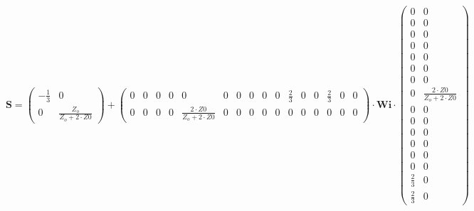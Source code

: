 \[ \mathbf{S} = \left(\begin{smallmatrix} -\frac{1}{3} & 0 \\ 0 &
\frac{Z_o}{Z_o+2\cdot Z0} \end{smallmatrix}\right) +
\left(\begin{smallmatrix} 0 & 0 & 0 & 0 & 0 & 0 & 0 & 0 & 0 & 0 &
\frac{2}{3} & 0 & 0 & \frac{2}{3} & 0 & 0 \\ 0 & 0 & 0 & 0 &
\frac{2\cdot Z0}{Z_o+2\cdot Z0} & 0 & 0 & 0 & 0 & 0 & 0 & 0 & 0 & 0 &
0 & 0 \end{smallmatrix}\right) \cdot \mathbf{Wi}
\cdot\left(\begin{smallmatrix} 0 & 0 \\ 0 & 0 \\ 0 & 0 \\ 0 & 0 \\ 0 &
0 \\ 0 & 0 \\ 0 & 0 \\ 0 & \frac{2\cdot Z0}{Z_o+2\cdot Z0} \\ 0 & 0 \\
0 & 0 \\ 0 & 0 \\ 0 & 0 \\ 0 & 0 \\ 0 & 0 \\ \frac{2}{3} & 0 \\
\frac{2}{3} & 0 \end{smallmatrix}\right) \]

